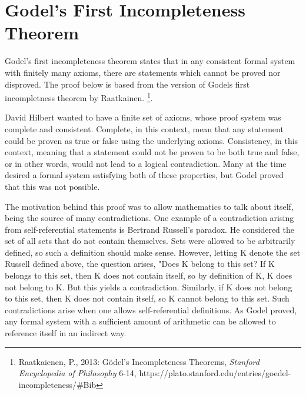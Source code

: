 \documentclass[%
 reprint,
 amsmath,amssymb,
 aps,
]{revtex4-2}
\begin{document}
\section{Godel's First Incompleteness Theorem}

Godel's first incompleteness theorem states that in any consistent formal system with finitely many axioms, there are statements which cannot be proved nor disproved.  The proof below is based from the version of Godels first incompletness theorem by Raatkainen. \footnote{\label{note1} Raatkaienen, P., 2013: Gödel’s Incompleteness Theorems, \textit{Stanford Encyclopedia of Philosophy} 6-14,
https://plato.stanford.edu/entries/goedel-incompleteness/#Bib }.

David Hilbert wanted to have a finite set of axioms, whose proof system was complete and consistent.  Complete, in this context, mean that any statement could be proven as true or false using the underlying axioms.  Consistency, in this context, meaning that a statement could not be proven to be both true and false, or in other words, would not lead to a logical contradiction.  Many at the time desired a formal system satisfying both of these properties, but Godel proved that this was not possible.

The motivation behind this proof was to allow mathematics to talk about itself, being the source of many contradictions.  One example of a contradiction arising from self-referential statements is Bertrand Russell's paradox.  He considered the set of all sets that do not contain themselves.  Sets were allowed to be arbitrarily defined, so such a definition should make sense.  However, letting K denote the set Russell defined above, the question arises, "Does K belong to this set?  If K belongs to this set, then K does not contain itself, so by definition of K, K does not belong to K.  But this yields a contradiction.  Similarly, if K does not belong to this set, then K does not contain itself, so K cannot belong to this set.  Such contradictions arise when one allows self-referential definitions.  As Godel proved, any formal system with a sufficient amount of arithmetic can be allowed to reference itself in an indirect way.  
\end{document}

